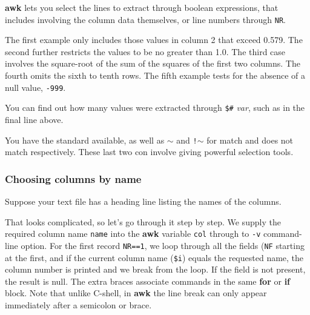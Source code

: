 \documentclass[twoside,11pt,nolof]{starlink}
\begin{document}
\textbf{awk} lets you select the lines to extract through boolean
expressions, that includes involving the column data themselves, or
line numbers through \texttt{NR}.
\begin{small}
\end{small}
The first example only includes those values in column 2 that exceed
0.579.  The second further restricts the values to be no greater than 1.0.
The third case involves the square-root of the sum of the squares of
the first two columns.  The fourth omits the sixth to tenth rows.
The fifth example tests for the absence of a null value, \texttt{-999}.

You can find out how many values were extracted through \texttt{\$\#}{\em
var}, such as in the final line above.

You have the standard 
available, as well as \texttt{$\sim$} and \texttt{!$\sim$} for match and does not match
respectively.  These last two con involve 
giving powerful selection tools.

\subsubsection{Choosing columns by name}

Suppose your text file has a heading line listing the names of the
columns.
\begin{small}
\end{small}
That looks complicated, so let's go through it step by step.  We
supply the required column name \texttt{name} into the \textbf{awk} variable
\texttt{col} through to \texttt{-v} command-line option.  For the first
record \texttt{NR==1}, we loop through all the fields (\texttt{NF} starting
at the first, and if the current column name (\texttt{\$i}) equals the
requested name, the column number is printed and we break from the
loop.  If the field is not present, the result is null.  The extra
braces associate commands in the same \textbf{for} or \textbf{if} block. Note that
unlike C-shell, in \textbf{awk} the line break can only appear
immediately after a semicolon or brace.
\end{document}

